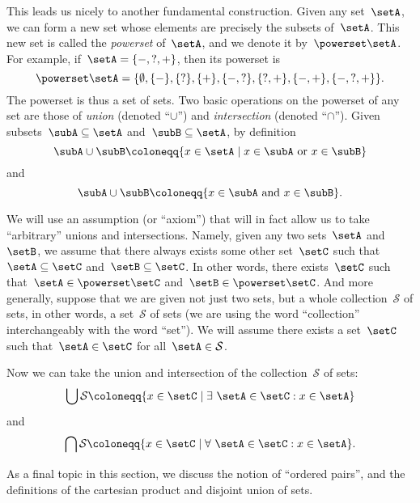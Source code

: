 This leads us nicely to another fundamental construction.
Given any set~$\setA$, we can form a new set whose elements are precisely the subsets of~$\setA$.
This new set is called the \emph{powerset} of~$\setA$, and we denote it by~$\powerset \setA$.
For example, if~$\setA = \{ -, ?, + \}$, then its powerset is
\begin{equation}
\powerset \setA = \{ \emptyset, \{ - \}, \{ ? \}, \{ + \}, \{ -, ? \}, \{ ?, + \}, \{ -, +\}, \{ -, ?, + \} \}. 
\end{equation}
The powerset is thus a set of sets. 
Two basic operations on the powerset of any set are those of \emph{union} (denoted ``$\cup$'') and \emph{intersection} (denoted ``$\cap$'').
Given subsets~$\subA \subseteq \setA$ and~$\subB \subseteq \setA$, by definition
\begin{equation}
\subA \cup \subB \coloneqq \{ x \in \setA \mid x \in \subA \text{ or } x \in \subB \}
\end{equation}
and
\begin{equation}
\subA \cup \subB \coloneqq \{ x \in \subA \text{ and } x \in \subB \}.
\end{equation}


We will use an assumption (or ``axiom'') that will in fact allow us to take ``arbitrary'' unions and intersections. 
Namely, given any two sets~$\setA$ and~$\setB$, we assume that there always exists some other set~$\setC$ such that~$\setA \subseteq \setC$ and~$\setB \subseteq \setC$.
In other words, there exists~$\setC$ such that~$\setA \in \powerset \setC$ and~$\setB \in \powerset \setC$.
And more generally, suppose that we are given not just two sets, but a whole collection~$\mathcal{S}$ of sets, in other words, a set~$\mathcal{S}$ of sets (we are using the word ``collection'' interchangeably with the word ``set'').
We will assume there exists a set~$\setC$ such that~$\setA \in \setC$ for all~$\setA \in \mathcal{S}$.

Now we can take the union and intersection of the collection~$\mathcal{S}$ of sets:
\begin{equation}
\bigcup \mathcal{S} \coloneqq \{ x \in \setC \mid \exists \  \setA \in \setC : x \in \setA \}
\end{equation}
and
\begin{equation}
\bigcap \mathcal{S} \coloneqq \{ x \in \setC \mid \forall \  \setA \in \setC : x \in \setA \}.
\end{equation}

\medskip

As a final topic in this section, we discuss the notion of ``ordered pairs'', and the definitions of the cartesian product and disjoint union of sets. 


